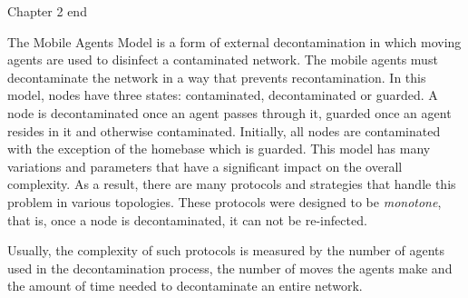Chapter 2 end 





The Mobile Agents Model is a form of external decontamination in which moving agents are used to disinfect a contaminated network.
The mobile agents must decontaminate the network in a way that prevents recontamination. In this model, nodes have three states: contaminated, decontaminated or guarded. A node is decontaminated once an agent passes through it, guarded once an agent resides in it and otherwise contaminated. Initially, all nodes are contaminated with the exception of the homebase which is guarded. This model has many variations and parameters that have a significant impact on the overall complexity. As a result, there are many protocols and strategies that handle this problem in various topologies. These protocols were designed to be {\em monotone}, that is, once a node is decontaminated, it can not be re-infected.

Usually, the complexity of such protocols is measured by the number of agents used in the decontamination process, the number of moves the agents make and the amount of time needed to decontaminate an entire network.

